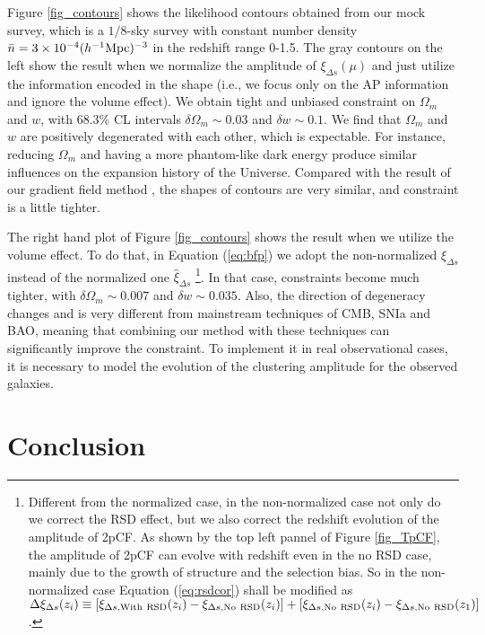 \documentclass[useAMS,usenatbib]{mn2e}
\begin{document}
Figure \ref{fig_contours} shows the likelihood contours obtained from our mock survey, 
which is a $1/8$-sky survey with constant number density $\bar n=3\times10^{-4}(h^{-1}{\rm Mpc})^{-3}$ in the redshift range 0-1.5.
The gray contours on the left show the result when we normalize the amplitude of $\xi_{\Delta s}(\mu)$ 
and just utilize the information encoded in the shape
(i.e., we focus only on the AP information and ignore the volume effect).
We obtain tight and unbiased constraint on $\Omega_m$ and $w$, with 68.3\% CL intervals $\delta \Omega_m\sim0.03$ and $\delta w\sim0.1$.
We find that $\Omega_m$ and $w$ are positively degenerated with each other, which is expectable.
For instance, reducing $\Omega_m$ and having a more phantom-like dark energy produce similar influences on the expansion history of the Universe. 
Compared with the result of our gradient field method \cite{Li2014},
the shapes of contours are very similar, and constraint is a little tighter.

The right hand plot of Figure \ref{fig_contours} shows the result when we utilize the volume effect.
To do that, in Equation (\ref{eq:bfp}) we adopt the non-normalized $\xi_{\Delta s}$ instead of the normalized one $\hat\xi_{\Delta s}$
\footnote{Different from the normalized case, in the non-normalized case not only do we correct the RSD effect, 
but we also correct the redshift evolution of the amplitude of 2pCF.
As shown by the top left pannel of Figure \ref{fig_TpCF}, the amplitude of 2pCF can evolve with redshift even in the no RSD case,
mainly due to the growth of structure and the selection bias.
So in the non-normalized case Equation (\ref{eq:rsdcor}) shall be modified as  
$\Delta \xi_{\Delta s}(z_i) \equiv \left[\xi_{\Delta s, {\rm With\ RSD}}(z_i) - \xi_{\Delta s, \rm No\ RSD}(z_i)\right]
+ \left[\xi_{\Delta s, \rm No\ RSD}(z_i) - \xi_{\Delta s, \rm No\ RSD}(z_1)\right]$.}. 
In that case, constraints become much tighter, with $\delta \Omega_m\sim0.007$ and $\delta w\sim0.035$.
Also, the direction of degeneracy changes and is very different from mainstream techniques of CMB, SNIa and BAO,
meaning that combining our method with these techniques can significantly improve the constraint.
To implement it in real observational cases, it is necessary to model the evolution of the clustering amplitude for the observed galaxies. 


\section{Conclusion}
\end{document}
